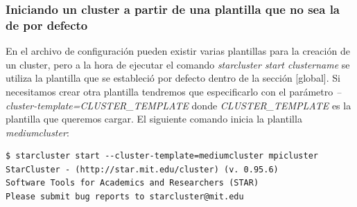 \documentclass{article}
\begin{document}
\subsubsection{Iniciando un cluster a partir de una plantilla que no sea la de por defecto}
	En el archivo de configuración pueden existir varias plantillas para la creación de un cluster, pero a la hora de ejecutar el comando \emph{starcluster start clustername} se utiliza la plantilla que se estableció por defecto dentro de la sección [global]. Si necesitamos crear otra plantilla tendremos que especificarlo  con el parámetro \emph{--cluster-template=CLUSTER\_TEMPLATE} donde \emph{CLUSTER\_TEMPLATE} es la plantilla que queremos cargar. El siguiente comando inicia la plantilla \emph{mediumcluster}:
\begin{lstlisting}[style=miniBash]
$ starcluster start --cluster-template=mediumcluster mpicluster
StarCluster - (http://star.mit.edu/cluster) (v. 0.95.6)
Software Tools for Academics and Researchers (STAR)
Please submit bug reports to starcluster@mit.edu


\end{lstlisting}
\end{document}
